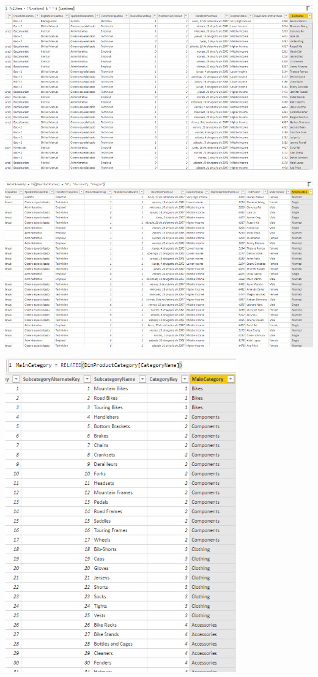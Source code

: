 \documentclass[12pt,letterpaper]{article}
\begin{document}
\begin{center}
\includegraphics[width=16cm]{images/14}\newline
\end{center}
\begin{center}
\includegraphics[width=16cm]{images/15}\newline
\end{center}
\begin{center}
\includegraphics[width=10cm]{images/16}\newline
\end{center}
\end{document}
